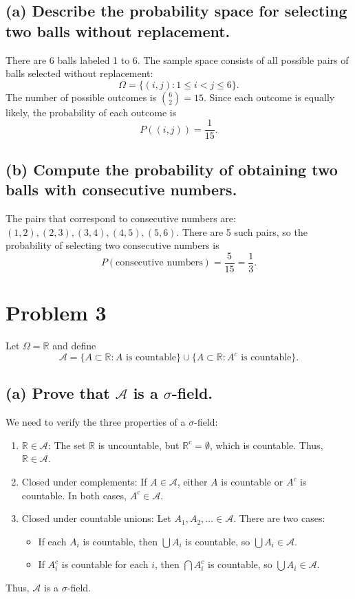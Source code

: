 \documentclass{article}
\begin{document}
\subsection*{(a) Describe the probability space for selecting two balls without replacement.}
There are 6 balls labeled 1 to 6. The sample space consists of all possible pairs of balls selected without replacement:
\[
\Omega = \{(i, j) : 1 \leq i < j \leq 6\}.
\]
The number of possible outcomes is \( \binom{6}{2} = 15 \). Since each outcome is equally likely, the probability of each outcome is
\[
P((i, j)) = \frac{1}{15}.
\]

\subsection*{(b) Compute the probability of obtaining two balls with consecutive numbers.}
The pairs that correspond to consecutive numbers are: \( (1,2), (2,3), (3,4), (4,5), (5,6) \). There are 5 such pairs, so the probability of selecting two consecutive numbers is
\[
P(\text{consecutive numbers}) = \frac{5}{15} = \frac{1}{3}.
\]

\section*{Problem 3}
Let \( \Omega = \mathbb{R} \) and define
\[
\mathcal{A} = \{A \subset \mathbb{R} : A \text{ is countable}\} \cup \{A \subset \mathbb{R} : A^c \text{ is countable}\}.
\]

\subsection*{(a) Prove that \( \mathcal{A} \) is a \( \sigma \)-field.}
We need to verify the three properties of a \( \sigma \)-field:
\begin{enumerate}
    \item \( \mathbb{R} \in \mathcal{A} \): The set \( \mathbb{R} \) is uncountable, but \( \mathbb{R}^c = \emptyset \), which is countable. Thus, \( \mathbb{R} \in \mathcal{A} \).
    \item Closed under complements: If \( A \in \mathcal{A} \), either \( A \) is countable or \( A^c \) is countable. In both cases, \( A^c \in \mathcal{A} \).
    \item Closed under countable unions: Let \( A_1, A_2, \dots \in \mathcal{A} \). There are two cases:
    \begin{itemize}
        \item If each \( A_i \) is countable, then \( \bigcup A_i \) is countable, so \( \bigcup A_i \in \mathcal{A} \).
        \item If \( A_i^c \) is countable for each \( i \), then \( \bigcap A_i^c \) is countable, so \( \bigcup A_i \in \mathcal{A} \).
    \end{itemize}
\end{enumerate}
Thus, \( \mathcal{A} \) is a \( \sigma \)-field.
\end{document}
